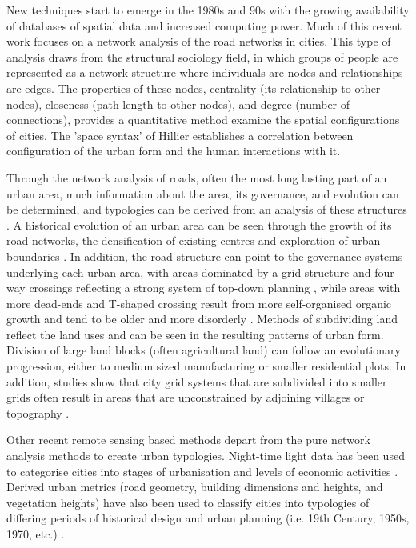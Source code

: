 \documentclass[10pt,letterpaper,hidelinks]{article}
\begin{document}
New techniques start to emerge in the 1980s and 90s with the growing availability of databases of spatial data and increased computing power. Much of this recent work focuses on a network analysis of the road networks in cities. This type of analysis draws from the structural sociology field, in which groups of people are represented as a network structure where individuals are nodes and relationships are edges. The properties of these nodes, centrality (its relationship to other nodes), closeness (path length to other nodes), and degree (number of connections), provides a quantitative method examine the spatial configurations of cities. The 'space syntax' of Hillier \cite{Hillier1996} establishes a correlation between configuration of the urban form and the human interactions with it. 

Through the network analysis of roads, often the most long lasting part of an urban area, much information about the area, its governance, and evolution can be determined, and typologies can be derived from an analysis of these structures \cite{Porta2006a}. A historical evolution of an urban area can be seen through the growth of its road networks, the densification of existing centres and exploration of urban boundaries \cite{Strano2012}. In addition, the road structure can point to the governance systems underlying each urban area, with areas dominated by a grid structure and four-way crossings reflecting a strong system of top-down planning \cite{Courtat2011}, while areas with more dead-ends and T-shaped crossing result from more self-organised organic growth \cite{Cardillo2006} and tend to be older and more disorderly \cite{Jacobs1961}. Methods of subdividing land reflect the land uses and can be seen in the resulting patterns of urban form. Division of large land blocks (often agricultural land) can follow an evolutionary progression, either to medium sized manufacturing or smaller residential plots. In addition, studies show that city grid systems that are subdivided into smaller grids often result in areas that are unconstrained by adjoining villages or topography \cite{Strano2012}. 

Other recent remote sensing based methods depart from the pure network analysis methods to create urban typologies. Night-time light data has been used to categorise cities into stages of urbanisation and levels of economic activities \cite{Zhang2013}. Derived urban metrics (road geometry, building dimensions and heights, and vegetation heights) have also been used to classify cities into typologies of differing periods of historical design and urban planning (i.e. 19th Century, 1950s, 1970, etc.) \cite{Hermosilla2014}.
\end{document}
